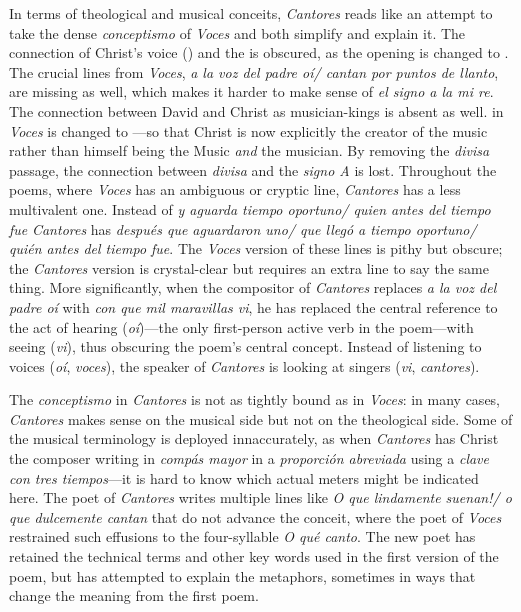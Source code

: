 In terms of theological and musical conceits, \emph{Cantores} reads like an attempt
to take the dense \emph{conceptismo} of \emph{Voces} and both simplify and explain it.
The connection of Christ's voice () and the  is obscured, as the opening is changed to .
The crucial lines from \emph{Voces}, \emph{a la voz del padre oí/ cantan por puntos de
llanto}, are missing as well, which makes it harder to make sense of \emph{el signo a
la mi re}.
The connection between David and Christ as musician-kings is absent as well.
 in \emph{Voces} is changed to ---so
that Christ is now explicitly the creator of the music rather than himself being
the Music \emph{and} the musician.
By removing the \emph{divisa} passage, the connection between \emph{divisa} and
the \emph{signo A} is lost.
Throughout the poems, where \emph{Voces} has an ambiguous or cryptic line, \emph{Cantores}
has a less multivalent one. 
Instead of \emph{y aguarda tiempo oportuno/ quien antes del tiempo fue} \emph{Cantores}
has \emph{después que aguardaron uno/ que llegó a tiempo oportuno/ quién antes
del tiempo fue}.
The \emph{Voces} version of these lines is pithy but obscure; the \emph{Cantores}
version is crystal-clear but requires an extra line to say the same thing.
More significantly, when the compositor of \emph{Cantores} replaces \emph{a la voz del
padre oí} with \emph{con que mil maravillas vi}, he has replaced the central reference
to the act of hearing (\emph{oí})---the only first-person active verb in the
poem---with seeing (\emph{vi}), thus obscuring the poem's central concept. 
Instead of listening to voices (\emph{oí}, \emph{voces}), the speaker of \emph{Cantores} is
looking at singers (\emph{vi}, \emph{cantores}).

The \emph{conceptismo} in \emph{Cantores} is not as tightly bound as in \emph{Voces}: in many
cases, \emph{Cantores} makes sense on the musical side but not on the theological
side.
Some of the musical terminology is deployed innaccurately, as when \emph{Cantores}
has Christ the composer writing in \emph{compás mayor} in a \emph{proporción abreviada}
using a \emph{clave con tres tiempos}---it is hard to know which actual meters might
be indicated here.
The poet of \emph{Cantores} writes multiple lines like \emph{O que lindamente suenan!/ o
que dulcemente cantan} that do not advance the conceit, where the poet of
\emph{Voces} restrained such effusions to the four-syllable \emph{O qué canto}.
The new poet has retained the technical terms and other key words used in the
first version of the poem, but has attempted to explain the metaphors, sometimes
in ways that change the meaning from the first poem.

